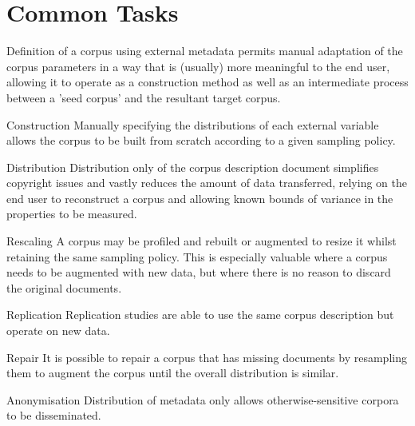 

\section{Common Tasks}
Definition of a corpus using external metadata permits manual adaptation of the corpus parameters in a way that is (usually) more meaningful to the end user, allowing it to operate as a construction method as well as an intermediate process between a 'seed corpus' and the resultant target corpus.


\begin{itemizeTitle}
    \item[Construction] Manually specifying the distributions of each external variable allows the corpus to be built from scratch according to a given sampling policy.

    \item[Distribution] Distribution only of the corpus description document simplifies copyright issues and vastly reduces the amount of data transferred, relying on the end user to reconstruct a corpus and allowing known bounds of variance in the properties to be measured.

    \item[Rescaling] A corpus may be profiled and rebuilt or augmented to resize it whilst retaining the same sampling policy.  This is especially valuable where a corpus needs to be augmented with new data, but where there is no reason to discard the original documents.

    \item[Replication] Replication studies are able to use the same corpus description but operate on new data.

    \item[Repair] It is possible to repair a corpus that has missing documents by resampling them to augment the corpus until the overall distribution is similar.

    \item[Anonymisation] Distribution of metadata only allows otherwise-sensitive corpora to be disseminated.
\end{itemizeTitle}




